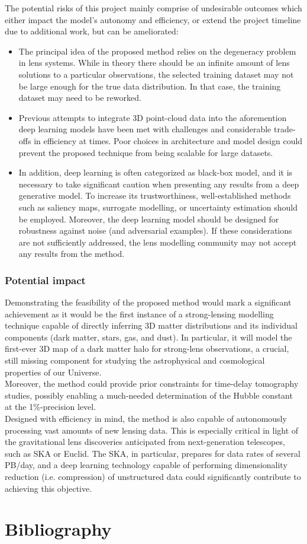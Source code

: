 \documentclass[a4paper,10pt]{article}
\begin{document}
The potential risks of this project mainly comprise of undesirable
outcomes which either impact the model's autonomy and efficiency, or
extend the project timeline due to additional work, but can be
ameliorated:
\begin{itemize}[leftmargin=*, noitemsep]
\item The principal idea of the proposed method relies on the degeneracy
problem in lens systems. While in theory there should be an infinite
amount of lens solutions to a particular observations, the selected
training dataset may not be large enough for the true data
distribution. In that case, the training dataset may need to be
reworked.
\item Previous attempts to integrate 3D point-cloud data into the
aforemention deep learning models have been met with challenges and
considerable trade-offs in efficiency at times. Poor choices in
architecture and model design could prevent the proposed technique
from being scalable for large datasets.
\item In addition, deep learning is often categorized as black-box model,
and it is necessary to take significant caution when presenting any
results from a deep generative model. To increase its trustworthiness,
well-established methods such as saliency maps, surrogate modelling,
or uncertainty estimation should be employed. Moreover, the deep
learning model should be designed for robustness against noise (and
adversarial examples). If these considerations are not sufficiently
addressed, the lens modelling community may not accept any results
from the method.
\end{itemize}

\subsubsection{Potential impact}
\label{sec:orgb03b259}

Demonstrating the feasibility of the proposed method would mark a
significant achievement as it would be the first instance of a
strong-lensing modelling technique capable of directly inferring 3D
matter distributions and its individual components (dark matter,
stars, gas, and dust).  In particular, it will model the first-ever 3D
map of a dark matter halo for strong-lens observations, a crucial,
still missing component for studying the astrophysical and
cosmological properties of our Universe. \\[0pt]
Moreover, the method could provide prior constraints for time-delay
tomography studies, possibly enabling a much-needed determination of
the Hubble constant at the 1\%-precision level. \\[0pt]
Designed with efficiency in mind, the method is also capable of
autonomously processing vast amounts of new lensing data. This is
especially critical in light of the gravitational lens discoveries
anticipated from next-generation telescopes, such as SKA or
Euclid. The SKA, in particular, prepares for data rates of several
PB/day, and a deep learning technology capable of performing
dimensionality reduction (i.e. compression) of unstructured data could
significantly contribute to achieving this objective.


\newpage
\section{Bibliography}
\label{sec:org22bac85}



\end{document}
